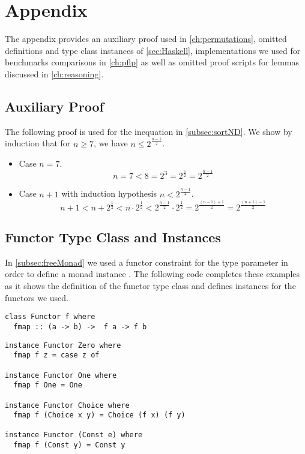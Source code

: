 \chapter{Appendix}
\label{sec:appendix}

The appendix provides an auxiliary proof used in \autoref{ch:permutations}, omitted definitions and type class instances of \autoref{sec:Haskell}, implementations we used for benchmarks comparisons in \autoref{ch:pflp} as well as omitted proof scripts for lemmas discussed in \autoref{ch:reasoning}.

\section{Auxiliary Proof}
\label{sec:appendix:inequation}

The following proof is used for the inequation in \autoref{subsec:sortND}.
We show by induction that for $n \geq 7$, we have $n \leq 2^{\frac{n-1}{2}}$.

\begin{itemize}
\item Case $n=7$.
  \[
    n = 7 < 8 = 2^3 = 2^{\frac{6}{2}}= 2^{\frac{n-1}{2}}
  \]
\item Case $n + 1$ with induction hypothesis $n < 2^{\frac{n-1}{2}}$.
  \[
    n + 1 < n + 2^{\frac{1}{2}} < n \cdot 2^{\frac{1}{2}}< 2^{\frac{n-1}{2}} \cdot 2^{\frac{1}{2}} =  2^{\frac{(n-1) + 1}{2}} = 2^{\frac{(n+1)-1}{2}}
  \]
\end{itemize}

\section{Functor Type Class and Instances}
\label{sec:appendix:functor}

In \autoref{subsec:freeMonad} we used a functor constraint for the type parameter  in order to define a monad instance .
The following code completes these examples as it shows the definition of the functor type class and defines instances for the functors we used.

\begin{verbatim}
class Functor f where
  fmap :: (a -> b) ->  f a -> f b
\end{verbatim}

\begin{verbatim}
instance Functor Zero where
  fmap f z = case z of  

instance Functor One where
  fmap f One = One

instance Functor Choice where
  fmap f (Choice x y) = Choice (f x) (f y)

instance Functor (Const e) where
  fmap f (Const y) = Const y
\end{verbatim}

